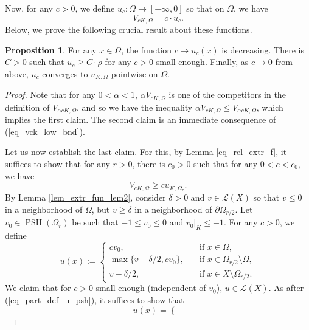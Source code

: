 \documentclass[12pt]{article}
\numberwithin{equation}{section}
\theoremstyle{theorem}
\theoremstyle{definition}
\newtheorem{prop}[thm]{Proposition}
\theoremstyle{remark}
\newcommand{\psh}{\operatorname{PSH}}
\begin{document}
	Now, for any $c > 0$, we define $u_c: \Omega \to [-\infty, 0]$ so that on $\Omega$, we have
	\begin{equation}
		V_{c K, \Omega} = c \cdot u_c.
	\end{equation}
	Below, we prove the following crucial result about these functions.
	\begin{prop}
		For any $x \in \Omega$, the function $c \mapsto u_c(x)$ is decreasing.
		There is $C > 0$ such that $u_c \geq C \cdot \rho$ for any $c > 0$ small enough.
		Finally, as $c \to 0$ from above, $u_c$ converges to $u_{K, \Omega}$ pointwise on $\Omega$.
	\end{prop}
	\begin{proof}
		Note that for any $0 < \alpha < 1$, $\alpha V_{cK, \Omega}$ is one of the competitors in the definition of $V_{\alpha cK, \Omega}$, and so we have the inequality $\alpha V_{cK, \Omega} \leq V_{\alpha cK, \Omega}$, which implies the first claim.
		The second claim is an immediate consequence of (\ref{eq_vck_low_bnd}).
		\par 
		Let us now establish the last claim.
		For this, by Lemma \ref{eq_rel_extr_f}, it suffices to show that for any $r > 0$, there is $c_0 > 0$ such that for any $0 < c < c_0$, we have 
		\begin{equation}\label{eq_vck_cukr}
			V_{cK, \Omega} \geq c u_{K, \Omega_r}.
		\end{equation}
		By Lemma \ref{lem_extr_fun_lem2}, consider $\delta > 0$ and $v \in \mathscr{L}(X)$ so that $v \leq 0$ in a neighborhood of $\overline{\Omega}$, but $v \geq \delta$ in a neighborhood of $\partial \Omega_{r/2}$.
		Let $v_0 \in \psh(\Omega_r)$ be such that $-1 \leq v_0 \leq 0$ and $v_0|_K \leq -1$.
		For any $c > 0$, we define
		\begin{equation}
			u(x) 
			:=
			\begin{cases}
				c v_0, \quad &\text{if } x \in \Omega,
				\\
				\max \big\{ v - \delta/2,  c v_0 \big\}, \quad &\text{if } x \in \Omega_{r/2} \setminus \Omega,
				\\
				v - \delta/2, \quad &\text{if } x \in X \setminus \Omega_{r/2}.
			\end{cases} 
		\end{equation}
		We claim that for $c > 0$ small enough (independent of $v_0$), $u \in \mathscr{L}(X)$. 
		As after (\ref{eq_part_def_u_psh}), it suffices to show that 
		\begin{equation}
			u(x) 
			=
			\begin{cases}

\end{cases}
\end{equation}
\end{proof}
\end{document}
